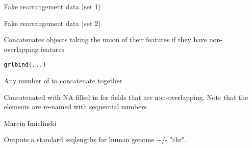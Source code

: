 \documentclass[a4paper]{book}
\begin{document}
%
\begin{Description}\relax
Fake rearrangement data (set 1)
\end{Description}
%
\begin{Format}
\end{Format}
%
\begin{Description}\relax
Fake rearrangement data (set 2)
\end{Description}
%
\begin{Format}
\end{Format}
%
\begin{Description}\relax
Concatenates  objects taking the union of their  features if they have non-overlapping features
\end{Description}
%
\begin{Usage}
\begin{verbatim}
grlbind(...)
\end{verbatim}
\end{Usage}
%
\begin{Arguments}
\begin{ldescription}
\item[\code{...}] Any number of  to concatenate together
\end{ldescription}
\end{Arguments}
%
\begin{Value}
Concatenated  with NA filled in for  fields that are non-overlapping. Note that the
elements are re-named with sequential numbers
\end{Value}
%
\begin{Author}\relax
Marcin Imielinski
\end{Author}
%
\begin{Examples}
\end{Examples}
%
\begin{Description}\relax
Outputs a standard seqlengths for human genome +/- "chr".
\end{Description}
\end{document}
